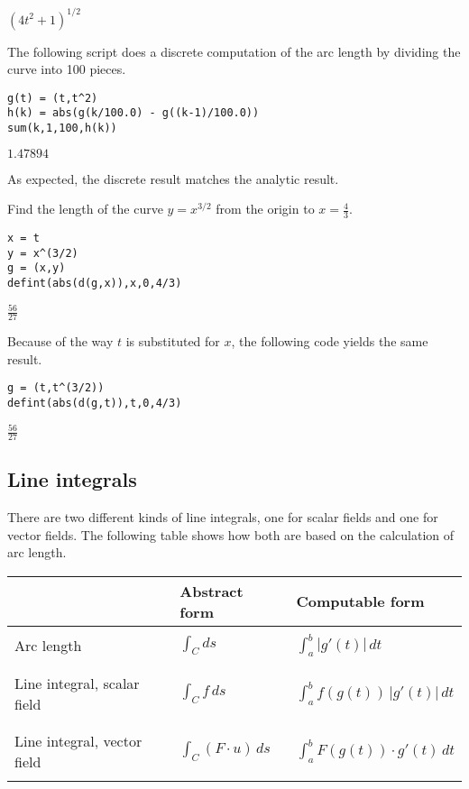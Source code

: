 \noindent
$\displaystyle (4t^2+1)^{1/2}$

\bigskip
\noindent
The following script does a discrete computation of the arc length
by dividing the curve into 100 pieces.

{\color{blue}
\begin{verbatim}
g(t) = (t,t^2)
h(k) = abs(g(k/100.0) - g((k-1)/100.0))
sum(k,1,100,h(k))
\end{verbatim}
}

\noindent
$\displaystyle 1.47894$

\bigskip
\noindent
As expected, the discrete result matches the analytic result.

\bigskip
\noindent
Find the length of the curve $y=x^{3/2}$ from the origin to
$x=\tfrac{4}{3}$.

{\color{blue}
\begin{verbatim}
x = t
y = x^(3/2)
g = (x,y)
defint(abs(d(g,x)),x,0,4/3)
\end{verbatim}
}

\noindent
$\displaystyle \tfrac{56}{27}$

\bigskip
\noindent
Because of the way $t$ is substituted for $x$,
the following code yields the same result.

{\color{blue}
\begin{verbatim}
g = (t,t^(3/2))
defint(abs(d(g,t)),t,0,4/3)
\end{verbatim}
}

\noindent
$\displaystyle \tfrac{56}{27}$

\subsection{Line integrals}
There are two different kinds of line integrals,
one for scalar fields and one
for vector fields.
The following table shows how both are based on the calculation of
arc length.

\begin{center}
\begin{tabular}{|l|l|l|}
\hline
& Abstract form
& Computable form
\\
\hline
 & &\\
Arc length
& $\displaystyle{\int_C ds}$
& $\displaystyle{\int_a^b |g'(t)|\,dt}$\\
 & &\\
\hline
 & & \\
Line integral, scalar field
& $\displaystyle{\int_C f\,ds}$
& $\displaystyle{\int_a^b f(g(t))\,|g'(t)|\,dt}$\\
& &\\
\hline
 & & \\
Line integral, vector field
& $\displaystyle{\int_C(F\cdot u)\,ds}$
& $\displaystyle{\int_a^b F(g(t))\cdot g'(t)\,dt}$\\
 & & \\
\hline
\end{tabular}
\end{center}

